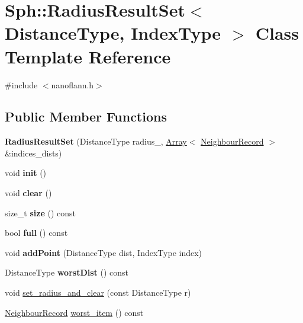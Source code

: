 \hypertarget{classSph_1_1RadiusResultSet}{}\section{Sph\+:\+:Radius\+Result\+Set$<$ Distance\+Type, Index\+Type $>$ Class Template Reference}
\label{classSph_1_1RadiusResultSet}


{\ttfamily \#include $<$nanoflann.\+h$>$}

\subsection*{Public Member Functions}
\begin{DoxyCompactItemize}
\item 
\hypertarget{classSph_1_1RadiusResultSet_a695d4e3b0072d02d431a33b65ce1d9c8}{}\label{classSph_1_1RadiusResultSet_a695d4e3b0072d02d431a33b65ce1d9c8} 
{\bfseries Radius\+Result\+Set} (Distance\+Type radius\+\_\+, \hyperlink{classArray}{Array}$<$ \hyperlink{structNeighbourRecord}{Neighbour\+Record} $>$ \&indices\+\_\+dists)
\item 
\hypertarget{classSph_1_1RadiusResultSet_abb3cd6030f375acc75d6b872db86d1c3}{}\label{classSph_1_1RadiusResultSet_abb3cd6030f375acc75d6b872db86d1c3} 
void {\bfseries init} ()
\item 
\hypertarget{classSph_1_1RadiusResultSet_aa5b31d797a6ee326d4eef489541d0a49}{}\label{classSph_1_1RadiusResultSet_aa5b31d797a6ee326d4eef489541d0a49} 
void {\bfseries clear} ()
\item 
\hypertarget{classSph_1_1RadiusResultSet_a1fc29160438f45e8639c3cc8db6ef174}{}\label{classSph_1_1RadiusResultSet_a1fc29160438f45e8639c3cc8db6ef174} 
size\+\_\+t {\bfseries size} () const
\item 
\hypertarget{classSph_1_1RadiusResultSet_a89c8ebc4c00883b65ee4aa66a2662e66}{}\label{classSph_1_1RadiusResultSet_a89c8ebc4c00883b65ee4aa66a2662e66} 
bool {\bfseries full} () const
\item 
\hypertarget{classSph_1_1RadiusResultSet_a3a733f893b9a991b6d30d6f8c133b6c9}{}\label{classSph_1_1RadiusResultSet_a3a733f893b9a991b6d30d6f8c133b6c9} 
void {\bfseries add\+Point} (Distance\+Type dist, Index\+Type index)
\item 
\hypertarget{classSph_1_1RadiusResultSet_a2a0d506ca93863bdfa7cb36d6db69fa9}{}\label{classSph_1_1RadiusResultSet_a2a0d506ca93863bdfa7cb36d6db69fa9} 
Distance\+Type {\bfseries worst\+Dist} () const
\item 
void \hyperlink{classSph_1_1RadiusResultSet_a50c0144e5989939328fa973cec8c54b6}{set\+\_\+radius\+\_\+and\+\_\+clear} (const Distance\+Type r)
\item 
\hyperlink{structNeighbourRecord}{Neighbour\+Record} \hyperlink{classSph_1_1RadiusResultSet_ac6e69e0729bcdca7191dc0ef92b98797}{worst\+\_\+item} () const
\end{DoxyCompactItemize}
